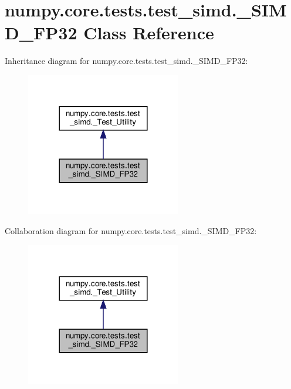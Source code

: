 \hypertarget{classnumpy_1_1core_1_1tests_1_1test__simd_1_1__SIMD__FP32}{}\section{numpy.\+core.\+tests.\+test\+\_\+simd.\+\_\+\+S\+I\+M\+D\+\_\+\+F\+P32 Class Reference}
\label{classnumpy_1_1core_1_1tests_1_1test__simd_1_1__SIMD__FP32}


Inheritance diagram for numpy.\+core.\+tests.\+test\+\_\+simd.\+\_\+\+S\+I\+M\+D\+\_\+\+F\+P32\+:
\nopagebreak
\begin{figure}[H]
\begin{center}
\leavevmode
\includegraphics[width=192pt]{classnumpy_1_1core_1_1tests_1_1test__simd_1_1__SIMD__FP32__inherit__graph}
\end{center}
\end{figure}


Collaboration diagram for numpy.\+core.\+tests.\+test\+\_\+simd.\+\_\+\+S\+I\+M\+D\+\_\+\+F\+P32\+:
\nopagebreak
\begin{figure}[H]
\begin{center}
\leavevmode
\includegraphics[width=192pt]{classnumpy_1_1core_1_1tests_1_1test__simd_1_1__SIMD__FP32__coll__graph}
\end{center}
\end{figure}
